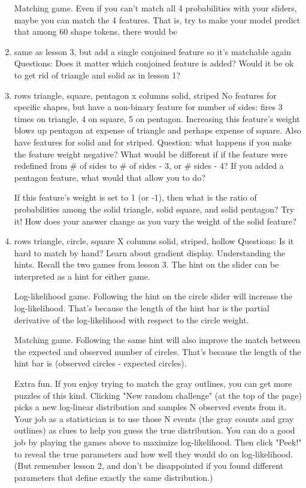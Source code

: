 \documentclass[11pt,letterpaper]{article}
\begin{document}
\begin{enumerate}
Matching game. Even if you can't match all 4 probabilities with your sliders, maybe you can match the 4 features. That is, try to make your model predict that among 60 shape tokens, there would be
\item same as lesson 3, but add a single conjoined feature so it’s matchable again Questions: Does it matter which conjoined feature is added?  Would it be ok to get rid of triangle and solid as in lesson 1?
\item rows {triangle, square, pentagon} x columns {solid, striped}
No features for specific shapes, but have a non-binary feature for number of sides: fires 3 times on triangle, 4 on square, 5 on pentagon.  Increasing this feature’s weight blows up pentagon at expense of triangle and perhaps expense of square.  Also have features for solid and for striped.
Question: what happens if you make the feature weight negative?  What would be different if if the feature were redefined from \# of sides to \# of sides - 3, or \# sides - 4?  If you added a pentagon feature, what would that allow you to do?

If this feature's weight is set to 1 (or -1), then what is the ratio of probabilities among the solid triangle, solid square, and solid pentagon? Try it! How does your answer change as you vary the weight of the solid feature?

\item rows {triangle, circle, square} X columns {solid, striped, hollow}
Questions: Is it hard to match by hand?  Learn about gradient display.
Understanding the hints. Recall the two games from lesson 3. The hint on the slider can be interpreted as a hint for either game.

Log-likelihood game. Following the hint on the circle slider will increase the log-likelihood. That's because the length of the hint bar is the partial derivative of the log-likelihood with respect to the circle weight.

Matching game. Following the same hint will also improve the match between the expected and observed number of circles. That's because the length of the hint bar is (observed circles - expected circles).


Extra fun. If you enjoy trying to match the gray outlines, you can get more puzzles of this kind. Clicking "New random challenge" (at the top of the page) picks a new log-linear distribution and samples N observed events from it. Your job as a statistician is to use those N events (the gray counts and gray outlines) as clues to help you guess the true distribution. You can do a good job by playing the games above to maximize log-likelihood. Then click "Peek!" to reveal the true parameters and how well they would do on log-likelihood. (But remember lesson 2, and don't be disappointed if you found different parameters that define exactly the same distribution.)


\end{enumerate}
\end{document}
